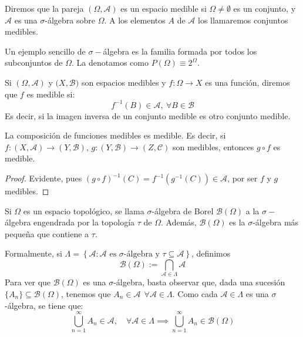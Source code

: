 \begin{ndef} Diremos que la pareja $(\Omega, \mathscr A)$ es un espacio medible si $\Omega \ne \emptyset$ es un conjunto, y $\mathscr A$ es una $\sigma$-álgebra sobre $\Omega$. A los elementos $A$ de $\mathscr A$ los llamaremos conjuntos medibles.
\end{ndef}

\begin{nota}
  Un ejemplo sencillo de $\sigma-$álgebra es la familia formada por todos los subconjuntos de $\Omega$. La denotamos como $P(\Omega) \equiv 2^\Omega$.
\end{nota}

\begin{ndef}
  Si $(\Omega,\mathscr A) $ y $(X,\mathcal{B)}$ son espacios medibles y \mbox{$f: \Omega \to X$} es una función, diremos que $f$ es medible si:
  \[
    f^{-1}(B) \in \mathscr A, \ \forall B \in \mathcal{B}
  \]
  Es decir, si la imagen inversa de un conjunto medible es otro conjunto medible.
\end{ndef}

\begin{nprop} La composición de funciones medibles es medible. Es decir, si\\ \mbox{$f:(X,\mathscr A) \longrightarrow (Y,\mathcal B)$}, $g:(Y,\mathcal B) \longrightarrow (Z,\mathcal C)$ son medibles, entonces $g\circ f$ es medible.
\end{nprop}

	\begin{proof}
	Evidente, pues $(g\circ f)^{-1}(C) = f^{-1}(g^{-1}(C)) \in \mathscr A$, por ser $f$ y $g$ medibles.
\end{proof}

\begin{ndef} Si $\Omega$ es un espacio topológico, se llama $\sigma$-álgebra de Borel $\mathcal B(\Omega)$ a la $\sigma-$álgebra engendrada por la topología $\tau$ de $\Omega$. Además, $\mathcal B(\Omega)$ es la $\sigma$-álgebra más pequeña que contiene a $\tau$.
\end{ndef}

Formalmente, si $\Lambda = \left\{ \mathscr A : \mathscr A \text{ es } \sigma \text{-álgebra y } \tau \subseteq \mathscr A \right\}$, definimos $$\mathcal B(\Omega) := \bigcap_{\mathscr A \in \Lambda} \mathscr A$$
Para ver que $\mathcal B(\Omega)$ es una $\sigma$-álgebra, basta observar que, dada una sucesión \mbox{$\{A_n\} \subseteq \mathcal B(\Omega)$}, tenemos que $A_n \in \mathscr A \ \ \forall \mathscr A \in \Lambda$. Como cada $\mathscr A \in \Lambda$ es una $\sigma$-álgebra, se tiene que: $$\bigcup_{n=1}^\infty A_n \in \mathscr A, \quad \forall \mathscr A \in \Lambda \implies \bigcup_{n=1}^\infty A_n \in \mathcal B(\Omega)$$

